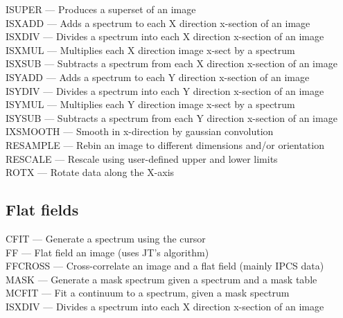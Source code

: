 \documentclass[11pt,twoside]{article}
\newcommand{\htmlref}[2]{#1}
\begin{document}
\htmlref{ISUPER}{ISUPER} --- Produces a superset of an image\\
\htmlref{ISXADD}{ISXADD} --- Adds a spectrum to each X direction x-section of an image\\
\htmlref{ISXDIV}{ISXDIV} --- Divides a spectrum into each X direction x-section of an image\\
\htmlref{ISXMUL}{ISXMUL} --- Multiplies each X direction image x-sect by a spectrum\\
\htmlref{ISXSUB}{ISXSUB} --- Subtracts a spectrum from each X direction x-section of an image\\
\htmlref{ISYADD}{ISYADD} --- Adds a spectrum to each Y direction x-section of an image\\
\htmlref{ISYDIV}{ISYDIV} --- Divides a spectrum into each Y direction x-section of an image\\
\htmlref{ISYMUL}{ISYMUL} --- Multiplies each Y direction image x-sect by a spectrum\\
\htmlref{ISYSUB}{ISYSUB} --- Subtracts a spectrum from each Y direction x-section of an image\\
\htmlref{IXSMOOTH}{IXSMOOTH} --- Smooth in x-direction by gaussian convolution\\
\htmlref{RESAMPLE}{RESAMPLE} --- Rebin an image to different dimensions and/or orientation\\
\htmlref{RESCALE}{RESCALE} --- Rescale using user-defined upper and lower limits\\
\htmlref{ROTX}{ROTX} --- Rotate data along the X-axis


\subsection{\label{classifflats}Flat fields}

\htmlref{CFIT}{CFIT} --- Generate a spectrum using the cursor\\
\htmlref{FF}{FF} --- Flat field an image (uses JT's algorithm)\\
\htmlref{FFCROSS}{FFCROSS} --- Cross-correlate an image and a flat field (mainly IPCS data)\\
\htmlref{MASK}{MASK} --- Generate a mask spectrum given a spectrum and a mask table\\
\htmlref{MCFIT}{MCFIT} --- Fit a continuum to a spectrum, given a mask spectrum\\
\htmlref{ISXDIV}{ISXDIV} --- Divides a spectrum into each X direction x-section of an image
\end{document}
